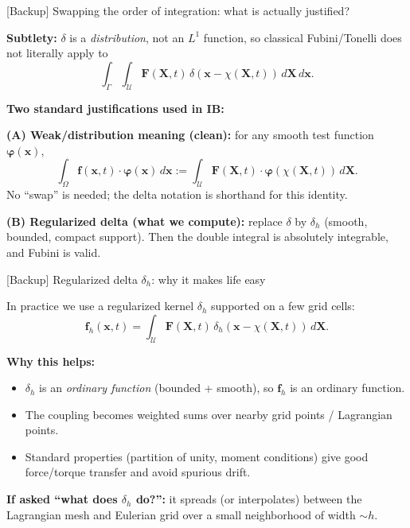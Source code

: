 \documentclass{beamer}
\begin{document}
\begin{frame}{[Backup] Swapping the order of integration: what is actually justified?}
\footnotesize

\textbf{Subtlety:} $\delta$ is a \emph{distribution}, not an $L^1$ function, so classical Fubini/Tonelli
does not literally apply to
\[
\int_{\Gamma}\int_{\mathcal U}\mathbf{F}(\mathbf{X},t)\,\delta(\mathbf{x}-\chi(\mathbf{X},t))\,d\mathbf{X}\,d\mathbf{x}.
\]

\medskip
\textbf{Two standard justifications used in IB:}

\medskip
\textbf{(A) Weak/distribution meaning (clean):}
for any smooth test function $\boldsymbol{\varphi}(\mathbf{x})$,
\[
\int_{\Omega}\mathbf{f}(\mathbf{x},t)\cdot\boldsymbol{\varphi}(\mathbf{x})\,d\mathbf{x}
:=
\int_{\mathcal U}\mathbf{F}(\mathbf{X},t)\cdot\boldsymbol{\varphi}(\chi(\mathbf{X},t))\,d\mathbf{X}.
\]
No ``swap'' is needed; the delta notation is shorthand for this identity.

\medskip
\textbf{(B) Regularized delta (what we compute):}
replace $\delta$ by $\delta_h$ (smooth, bounded, compact support). Then the double integral is absolutely integrable,
and Fubini is valid.

\end{frame}

\begin{frame}{[Backup] Regularized delta $\delta_h$: why it makes life easy}
\footnotesize

In practice we use a regularized kernel $\delta_h$ supported on a few grid cells:
\[
\mathbf{f}_h(\mathbf{x},t)=\int_{\mathcal U}\mathbf{F}(\mathbf{X},t)\,
\delta_h(\mathbf{x}-\chi(\mathbf{X},t))\,d\mathbf{X}.
\]

\medskip
\textbf{Why this helps:}
\begin{itemize}\itemsep3pt
\item $\delta_h$ is an \emph{ordinary function} (bounded + smooth), so $\mathbf{f}_h$ is an ordinary function.
\item The coupling becomes weighted sums over nearby grid points / Lagrangian points.
\item Standard properties (partition of unity, moment conditions) give good force/torque transfer and avoid spurious drift.
\end{itemize}

\medskip
\textbf{If asked “what does $\delta_h$ do?”:}
it spreads (or interpolates) between the Lagrangian mesh and Eulerian grid over a small neighborhood of width $\sim h$.

\end{frame}
\end{document}
